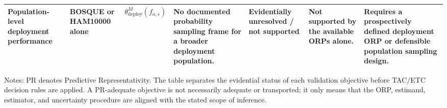 \begin{table}[h!]
\begin{tabular}{p{2.5cm}p{2.5cm}p{2.1cm}p{3.4cm}p{2.5cm}p{3.3cm}p{3.2cm}}
\addlinespace
Population-level deployment performance & BOSQUE or HAM10000 alone & $\theta_{\mathrm{deploy}}^M(f_{a,s})$ & No documented probability sampling frame for a broader deployment population. & Evidentially unresolved / not supported & Not supported by the available ORPs alone. & Requires a prospectively defined deployment ORP or defensible population sampling design. \\
\bottomrule
\end{tabular}
\begin{flushleft}
\footnotesize Notes: PR denotes Predictive Representativity. The table separates the evidential status of each validation objective before TAC/ETC decision rules are applied. A PR-adequate objective is not necessarily adequate or transported; it only means that the ORP, estimand, estimator, and uncertainty procedure are aligned with the stated scope of inference.
\end{flushleft}
\end{table}
